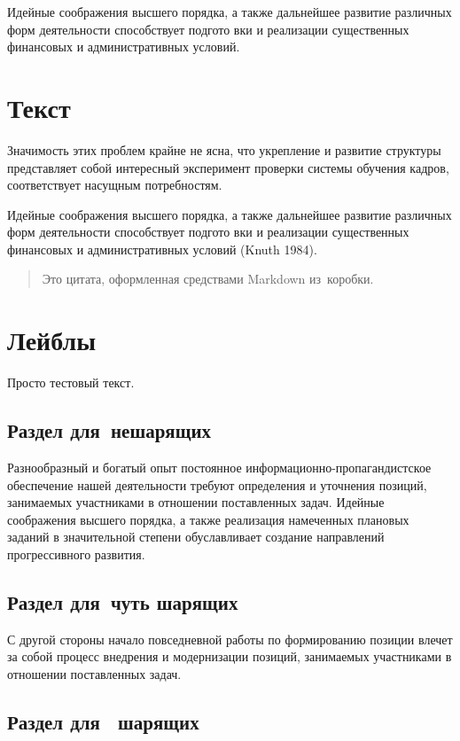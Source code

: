 \documentclass[
  russian,
  letterpaper,
  DIV=11,
  numbers=noendperiod,
  oneside]{scrreprt}
\theoremstyle{definition}
\theoremstyle{plain}
\theoremstyle{plain}
\theoremstyle{definition}
\theoremstyle{plain}
\theoremstyle{plain}
\theoremstyle{plain}
\theoremstyle{plain}
\theoremstyle{definition}
\theoremstyle{remark}
\begin{document}
Идейные соображения высшего порядка, а также дальнейшее развитие
различных форм деятельности способствует подгото вки и реализации
существенных финансовых и административных условий.

\section{Текст}\label{debug-text}

Значимость этих проблем крайне не ясна, что укрепление и развитие
структуры представляет собой интересный эксперимент проверки системы
обучения кадров, соответствует насущным потребностям.

Идейные соображения высшего порядка, а также дальнейшее развитие
различных форм деятельности способствует подгото вки и реализации
существенных финансовых и административных условий (Knuth 1984).

\begin{quote}
Это цитата, оформленная средствами Markdown из~коробки.
\end{quote}

\section{Лейблы}\label{debug-labs}

Просто тестовый текст.

\subsection{Раздел для~нешарящих}\label{debug-labs-novice}

Разнообразный и богатый опыт постоянное информационно-пропагандистское
обеспечение нашей деятельности требуют определения и уточнения позиций,
занимаемых участниками в отношении поставленных задач. Идейные
соображения высшего порядка, а также реализация намеченных плановых
заданий в значительной степени обуславливает создание направлений
прогрессивного развития.

\subsection{Раздел для~чуть шарящих}\label{debug-labs-junior}

С другой стороны начало повседневной работы по формированию позиции
влечет за собой процесс внедрения и модернизации позиций, занимаемых
участниками в отношении поставленных задач.

\subsection{Раздел для~ шарящих}\label{debug-labs-middle}
\end{document}
